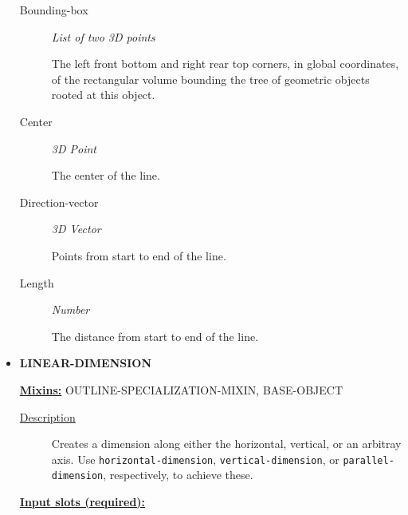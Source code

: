 \documentclass [11pt]{book}
\begin{document}
\begin{itemize}
\begin{description}
\item [Bounding-box]
\emph{List of two 3D points}

 The left front bottom and right rear top corners, in global coordinates,
of the rectangular volume bounding the tree of geometric objects rooted at this object.




\item [Center]
\emph{3D Point}

 The center of the line.




\item [Direction-vector]
\emph{3D Vector}

 Points from start to end of the line.




\item [Length]
\emph{Number}

 The distance from start to end of the line.




\end{description}







\item {}
\label{prim:linear-dimension}
\textbf{LINEAR-DIMENSION}


\textbf{
\underline{Mixins:}} OUTLINE-SPECIALIZATION-MIXIN, BASE-OBJECT





\begin{description}

\item [
\underline{Description}]


Creates a dimension along either the
horizontal, vertical, or an arbitray axis. Use
\texttt{horizontal-dimension}, \texttt{vertical-dimension}, or
\texttt{parallel-dimension}, respectively, to achieve these.



\end{description}








\textbf{
\underline{Input slots (required):}}

\begin{description}


\end{description}
\end{itemize}
\end{document}
